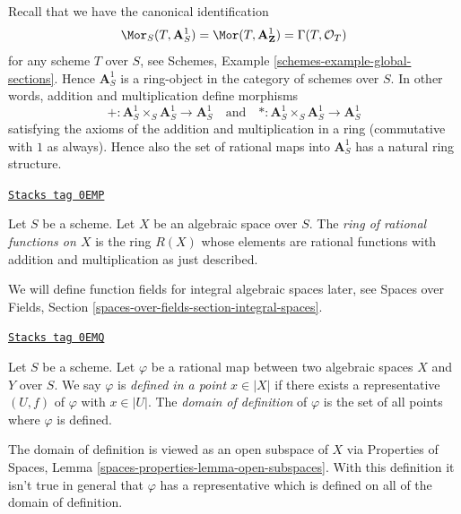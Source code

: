 \medskip\noindent
Recall that we have the canonical identification
$$
\Mor_S(T, \mathbf{A}^1_S) = \Mor(T, \mathbf{A}^1_\mathbf{Z}) =
\Gamma(T, \mathcal{O}_T)
$$
for any scheme $T$ over $S$, see
Schemes, Example \ref{schemes-example-global-sections}.
Hence $\mathbf{A}^1_S$ is a ring-object in the
category of schemes over $S$. In other words, addition
and multiplication define morphisms
$$
+ : \mathbf{A}^1_S \times_S \mathbf{A}^1_S \to \mathbf{A}^1_S
\quad\text{and}\quad
* : \mathbf{A}^1_S \times_S \mathbf{A}^1_S \to \mathbf{A}^1_S
$$
satisfying the axioms of the addition and multiplication in a ring
(commutative with $1$ as always). Hence also the set of rational
maps into $\mathbf{A}^1_S$ has a natural ring structure.

\begin{definition}
\label{spaces-morphisms-definition-ring-of-rational-functions}
\href{https://stacks.math.columbia.edu/tag/0EMP}{\texttt{Stacks tag 0EMP}}

Let $S$ be a scheme.
Let $X$ be an algebraic space over $S$.
The {\it ring of rational functions on $X$}
is the ring $R(X)$ whose elements are rational functions with
addition and multiplication as just described.
\end{definition}

We will define function fields for integral algebraic spaces later, see
Spaces over Fields, Section \ref{spaces-over-fields-section-integral-spaces}.

\begin{definition}
\label{spaces-morphisms-definition-domain-of-definition}
\href{https://stacks.math.columbia.edu/tag/0EMQ}{\texttt{Stacks tag 0EMQ}}

Let $S$ be a scheme. Let $\varphi$ be a rational map between two
algebraic spaces $X$ and $Y$ over $S$. We say
$\varphi$ is {\it defined in a point $x \in |X|$} if there exists a
representative $(U, f)$ of $\varphi$ with $x \in |U|$. The
{\it domain of definition} of $\varphi$ is the set of all points
where $\varphi$ is defined.
\end{definition}

The domain of definition is viewed as an open subspace of $X$ via
Properties of Spaces, Lemma \ref{spaces-properties-lemma-open-subspaces}.
With this definition it isn't true in general that $\varphi$ has a
representative which is defined on all of the domain of definition.

